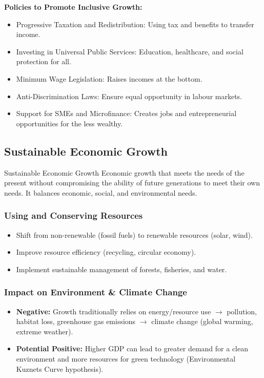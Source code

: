 \documentclass[11pt, a4paper, twoside]{book}
\begin{document}
\textbf{Policies to Promote Inclusive Growth:}
\begin{itemize}
  \item Progressive Taxation and Redistribution: Using tax and benefits to transfer income.
  \item Investing in Universal Public Services: Education, healthcare, and social protection for all.
  \item Minimum Wage Legislation: Raises incomes at the bottom.
  \item Anti-Discrimination Laws: Ensure equal opportunity in labour markets.
  \item Support for SMEs and Microfinance: Creates jobs and entrepreneurial opportunities for the less wealthy.
\end{itemize}

\subsection{Sustainable Economic Growth}

\begin{keyterm}{Sustainable Economic Growth}
Economic growth that meets the needs of the present without compromising the ability of future generations to meet their own needs. It balances economic, social, and environmental needs.
\end{keyterm}

\subsubsection{Using and Conserving Resources}

\begin{itemize}
  \item Shift from non-renewable (fossil fuels) to renewable resources (solar, wind).
  \item Improve resource efficiency (recycling, circular economy).
  \item Implement sustainable management of forests, fisheries, and water.
\end{itemize}

\subsubsection{Impact on Environment \& Climate Change}

\begin{itemize}
  \item \textbf{Negative:} Growth traditionally relies on energy/resource use $\rightarrow$ pollution, habitat loss, greenhouse gas emissions $\rightarrow$ climate change (global warming, extreme weather).
  \item \textbf{Potential Positive:} Higher GDP can lead to greater demand for a clean environment and more resources for green technology (Environmental Kuznets Curve hypothesis).
\end{itemize}
\end{document}
